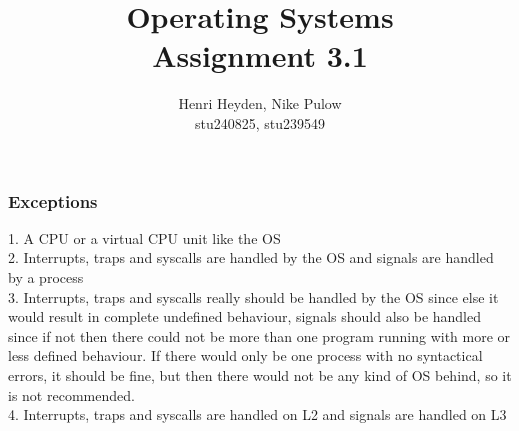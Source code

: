 \documentclass[12pt, a4paper]{article}
\title{Operating Systems\\Assignment 3.1}
\author{Henri Heyden, Nike Pulow \\ \small stu240825, stu239549}
\date{}
\begin{document}
\maketitle


\subsubsection*{Exceptions}
1. A CPU or a virtual CPU unit like the OS \\
2. Interrupts, traps and syscalls are handled by the OS and signals are handled by a process \\
3. Interrupts, traps and syscalls really should be handled by the OS since else it would result in complete undefined behaviour, signals should also be handled since if not then there could not be more than one program running with more or less defined behaviour. If there would only be one process with no syntactical errors, it should be fine, but then there would not be any kind of OS behind, so it is not recommended. \\
4. Interrupts, traps and syscalls are handled on L2 and signals are handled on L3
\end{document}
